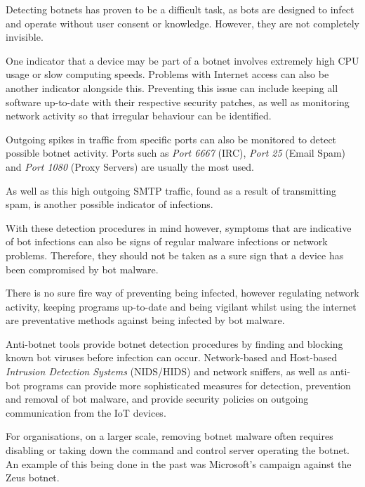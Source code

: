 \raggedright

Detecting botnets has proven to be a difficult task, as bots are designed to infect and operate without user consent or knowledge. However, they are not completely invisible\textsuperscript{\cite{lee2007botnet}}.

\vspace{0.5cm}

One indicator that a device may be part of a botnet involves extremely high CPU usage or slow computing speeds. Problems with Internet access can also be another indicator alongside this. Preventing this issue can include keeping all software up-to-date with their respective security patches, as well as monitoring network activity so that irregular behaviour can be identified\textsuperscript{\cite{gu2008botsniffer}}.

\vspace{0.5cm}

Outgoing spikes in traffic from specific ports can also be monitored to detect possible botnet activity. Ports such as \textit{Port 6667} (IRC), \textit{Port 25} (Email Spam) and \textit{Port 1080} (Proxy Servers) are usually the most used.

As well as this high outgoing SMTP traffic, found as a result of transmitting spam, is another possible indicator of infections.

\vspace{0.5cm}

With these detection procedures in mind however, symptoms that are indicative of bot infections can also be signs of regular malware infections or network problems. Therefore, they should not be taken as a sure sign that a device has been compromised by bot malware.

There is no sure fire way of preventing being infected, however regulating network activity, keeping programs up-to-date and being vigilant whilst using the internet are preventative methods against being infected by bot malware.

Anti-botnet tools provide botnet detection procedures by finding and blocking known bot viruses before infection can occur. Network-based and Host-based \textit{Intrusion Detection Systems} (NIDS/HIDS) and network sniffers, as well as anti-bot programs can provide more sophisticated measures for detection, prevention and removal of bot malware, and provide security policies on outgoing communication from the IoT devices\textsuperscript{\cite{braun2017system}}.

\vspace{0.5cm}

For organisations, on a larger scale, removing botnet malware often requires disabling or taking down the command and control server operating the botnet. An example of this being done in the past was Microsoft's campaign against the Zeus botnet\textsuperscript{\cite{zeusbotnet}}.